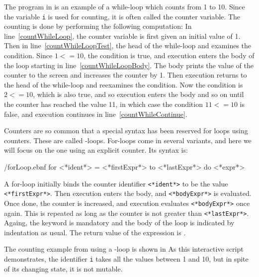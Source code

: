 \documentclass[fsharpNotes.tex]{subfiles}
\begin{document}
The program in  is an example of a while-loop which counts from 1 to 10.
%
%
Since the variable \lstinline{i} is used for counting, it is often called the counter variable. The counting is done by performing the following computation: In line~\ref{countWhileLoop}, the counter variable is first given an initial value of 1. Then in line~\ref{countWhileLoopTest}, the head of the while-loop and examines the condition. Since $1 <= 10$, the condition is true, and execution enters the body of the loop starting in line~\ref{countWhileLoopBody}. The body prints the value of the counter to the screen and increases the counter by 1. Then execution returns to the head of the while-loop and reexamines the condition. Now the condition is $2 <= 10$, which is also true, and so execution enters the body and so on until the counter has reached the value 11, in which case the condition $11 <= 10$ is false, and execution continues in line~\ref{countWhileContinue}.

Counters are so common that a special syntax has been reserved for loops using counters. These are called -loops. For-loops come in several variants, and here we will focus on the one using an explicit counter. Its syntax is:
%
\begin{verbatimwrite}{\ebnf/forLoop.ebnf}
for <*ident*> = <*firstExpr*> to <*lastExpr*> do
  <*expr*>
\end{verbatimwrite}
%
A for-loop initially binds the counter identifier \lstinline[language=syntax]{<*ident*>} to be the value \lstinline[language=syntax]{<*firstExpr*>}. Then execution enters the body, and \lstinline[language=syntax]{<*bodyExpr*>} is evaluated. Once done, the counter is increased, and execution evaluates \lstinline[language=syntax]{<*bodyExpr*>}  once again. This is repeated as long as the counter is not greater than \lstinline[language=syntax]{<*lastExpr*>}. Againg, the  keyword is mandatory and the body of the loop is indicated by indentation as usual. The return value of the  expression is \lexeme{()}.

The counting example from  using a -loop is shown in 
%
%
As this interactive script demonstrates, the identifier \lstinline!i! takes all the values between 1 and 10, but in spite of its changing state, it is not mutable.
\end{document}
